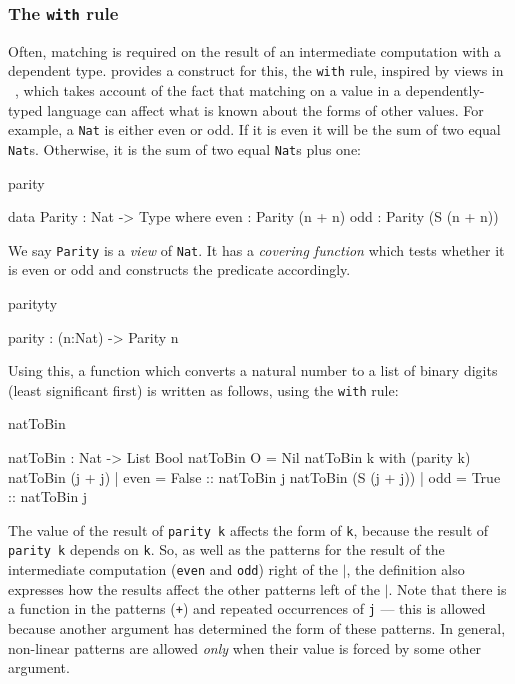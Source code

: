 \subsubsection{The \texttt{with} rule}

Often, matching is required on the result of an intermediate computation
with a dependent type.
\Idris{} provides a construct for this, the \texttt{with} rule, 
inspired by views in \Epigram~\cite{McBride2004a},
which takes account of the
fact that matching on a value in a dependently-typed language can affect what
is known about the forms of other values. 
%
For example, a \texttt{Nat} is either even or odd. 
If it is even it will
be the sum of two equal \texttt{Nat}s. Otherwise, it is the sum of two equal \texttt{Nat}s 
plus one:

\begin{SaveVerbatim}{parity}

data Parity : Nat -> Type where
   even : Parity (n + n)
   odd  : Parity (S (n + n))

\end{SaveVerbatim}

\noindent
We say \texttt{Parity} is a \emph{view} of \texttt{Nat}. 
It has a \emph{covering function} which tests whether
it is even or odd and constructs the predicate accordingly.

\begin{SaveVerbatim}{parityty}

parity : (n:Nat) -> Parity n

\end{SaveVerbatim}

\noindent
Using this, a function which converts a natural number to a list
of binary digits (least significant first) is written as follows, using the \texttt{with}
rule:

\begin{SaveVerbatim}{natToBin}

natToBin : Nat -> List Bool
natToBin O = Nil
natToBin k with (parity k)
   natToBin (j + j)     | even = False :: natToBin j
   natToBin (S (j + j)) | odd  = True  :: natToBin j

\end{SaveVerbatim}

\noindent
The value of the result of \texttt{parity k} affects the form of \texttt{k}, 
because the result
of \texttt{parity k} depends on \texttt{k}. 
So, as well as the patterns for the result of the
intermediate computation (\texttt{even} and \texttt{odd}) right of the 
\texttt{$\mid$}, the definition also expresses how
the results affect the other patterns left of the $\mid$. Note that there is a
function in the patterns (\texttt{+}) and repeated occurrences of \texttt{j} --- 
this is allowed
because another argument has determined the form of these patterns. In general,
non-linear patterns are allowed \emph{only} when their value is forced by
some other argument.


